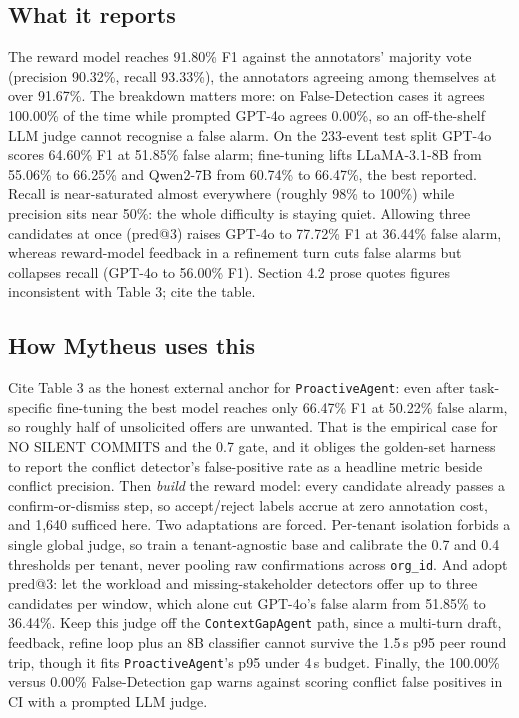 \subsection{What it reports}

The reward model reaches 91.80\% F1 against the annotators' majority vote (precision 90.32\%, recall 93.33\%), the annotators agreeing among themselves at over 91.67\%. The breakdown matters more: on False-Detection cases it agrees 100.00\% of the time while prompted GPT-4o agrees 0.00\%, so an off-the-shelf LLM judge cannot recognise a false alarm. On the 233-event test split GPT-4o scores 64.60\% F1 at 51.85\% false alarm; fine-tuning lifts LLaMA-3.1-8B from 55.06\% to 66.25\% and Qwen2-7B from 60.74\% to 66.47\%, the best reported. Recall is near-saturated almost everywhere (roughly 98\% to 100\%) while precision sits near 50\%: the whole difficulty is staying quiet. Allowing three candidates at once (pred@3) raises GPT-4o to 77.72\% F1 at 36.44\% false alarm, whereas reward-model feedback in a refinement turn cuts false alarms but collapses recall (GPT-4o to 56.00\% F1). Section 4.2 prose quotes figures inconsistent with Table 3; cite the table.

\subsection{How Mytheus uses this}
\begin{takeaway}
Cite Table 3 as the honest external anchor for \texttt{ProactiveAgent}: even after task-specific fine-tuning the best model reaches only 66.47\% F1 at 50.22\% false alarm, so roughly half of unsolicited offers are unwanted. That is the empirical case for NO SILENT COMMITS and the 0.7 gate, and it obliges the golden-set harness to report the conflict detector's false-positive rate as a headline metric beside conflict precision. Then \emph{build} the reward model: every candidate already passes a confirm-or-dismiss step, so accept/reject labels accrue at zero annotation cost, and 1,640 sufficed here. Two adaptations are forced. Per-tenant isolation forbids a single global judge, so train a tenant-agnostic base and calibrate the 0.7 and 0.4 thresholds per tenant, never pooling raw confirmations across \texttt{org\_id}. And adopt pred@3: let the workload and missing-stakeholder detectors offer up to three candidates per window, which alone cut GPT-4o's false alarm from 51.85\% to 36.44\%. Keep this judge off the \texttt{ContextGapAgent} path, since a multi-turn draft, feedback, refine loop plus an 8B classifier cannot survive the 1.5\,s p95 peer round trip, though it fits \texttt{ProactiveAgent}'s p95 under 4\,s budget. Finally, the 100.00\% versus 0.00\% False-Detection gap warns against scoring conflict false positives in CI with a prompted LLM judge.
\end{takeaway}

